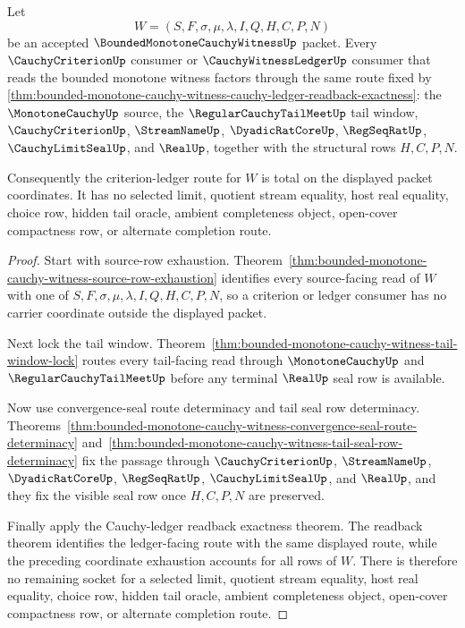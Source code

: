 \begin{theorem}
\label{thm:bounded-monotone-cauchy-witness-criterion-ledger-route-totality}
Let
$$
W=(S,F,\sigma,\mu,\lambda,I,Q,H,C,P,N)
$$
be an accepted $\BoundedMonotoneCauchyWitnessUp$ packet. Every $\CauchyCriterionUp$ consumer or $\CauchyWitnessLedgerUp$ consumer that reads the bounded monotone witness factors through the same route fixed by \autoref{thm:bounded-monotone-cauchy-witness-cauchy-ledger-readback-exactness}: the $\MonotoneCauchyUp$ source, the $\RegularCauchyTailMeetUp$ tail window, $\CauchyCriterionUp$, $\StreamNameUp$, $\DyadicRatCoreUp$, $\RegSeqRatUp$, $\CauchyLimitSealUp$, and $\RealUp$, together with the structural rows $H,C,P,N$.

Consequently the criterion-ledger route for $W$ is total on the displayed packet coordinates. It has no selected limit, quotient stream equality, host real equality, choice row, hidden tail oracle, ambient completeness object, open-cover compactness row, or alternate completion route.
\end{theorem}
\begin{proof}
Start with source-row exhaustion. Theorem~\ref{thm:bounded-monotone-cauchy-witness-source-row-exhaustion} identifies every source-facing read of $W$ with one of $S,F,\sigma,\mu,\lambda,I,Q,H,C,P,N$, so a criterion or ledger consumer has no carrier coordinate outside the displayed packet.

Next lock the tail window. Theorem~\ref{thm:bounded-monotone-cauchy-witness-tail-window-lock} routes every tail-facing read through $\MonotoneCauchyUp$ and $\RegularCauchyTailMeetUp$ before any terminal $\RealUp$ seal row is available.

Now use convergence-seal route determinacy and tail seal row determinacy. Theorems~\ref{thm:bounded-monotone-cauchy-witness-convergence-seal-route-determinacy} and~\ref{thm:bounded-monotone-cauchy-witness-tail-seal-row-determinacy} fix the passage through $\CauchyCriterionUp$, $\StreamNameUp$, $\DyadicRatCoreUp$, $\RegSeqRatUp$, $\CauchyLimitSealUp$, and $\RealUp$, and they fix the visible seal row once $H,C,P,N$ are preserved.

Finally apply the Cauchy-ledger readback exactness theorem. The readback theorem identifies the ledger-facing route with the same displayed route, while the preceding coordinate exhaustion accounts for all rows of $W$. There is therefore no remaining socket for a selected limit, quotient stream equality, host real equality, choice row, hidden tail oracle, ambient completeness object, open-cover compactness row, or alternate completion route.
\end{proof}

